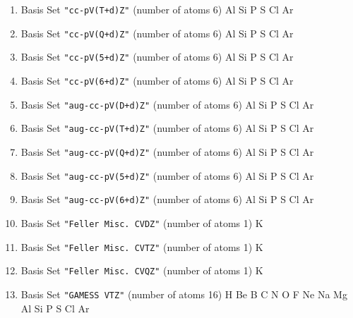 \begin{enumerate}
\item Basis Set \verb#"cc-pV(T+d)Z"# (number of atoms 6)  \newline
  Al Si P S Cl Ar


\item Basis Set \verb#"cc-pV(Q+d)Z"# (number of atoms 6)  \newline
  Al Si P S Cl Ar

\item Basis Set \verb#"cc-pV(5+d)Z"# (number of atoms 6)  \newline
  Al Si P S Cl Ar


\item Basis Set \verb#"cc-pV(6+d)Z"# (number of atoms 6)  \newline
  Al Si P S Cl Ar


\item Basis Set \verb#"aug-cc-pV(D+d)Z"# (number of atoms 6)  \newline
  Al Si P S Cl Ar


\item Basis Set \verb#"aug-cc-pV(T+d)Z"# (number of atoms 6)  \newline
  Al Si P S Cl Ar


\item Basis Set \verb#"aug-cc-pV(Q+d)Z"# (number of atoms 6)  \newline
  Al Si P S Cl Ar


\item Basis Set \verb#"aug-cc-pV(5+d)Z"# (number of atoms 6)  \newline
  Al Si P S Cl Ar


\item Basis Set \verb#"aug-cc-pV(6+d)Z"# (number of atoms 6)  \newline
  Al Si P S Cl Ar


\item Basis Set \verb#"Feller Misc. CVDZ"# (number of atoms 1)  \newline
  K


\item Basis Set \verb#"Feller Misc. CVTZ"# (number of atoms 1)  \newline
  K


\item Basis Set \verb#"Feller Misc. CVQZ"# (number of atoms 1)  \newline
  K


\item Basis Set \verb#"GAMESS VTZ"# (number of atoms 16)  \newline
  H Be B C N O F Ne Na Mg Al Si P S Cl Ar


\end{enumerate}
